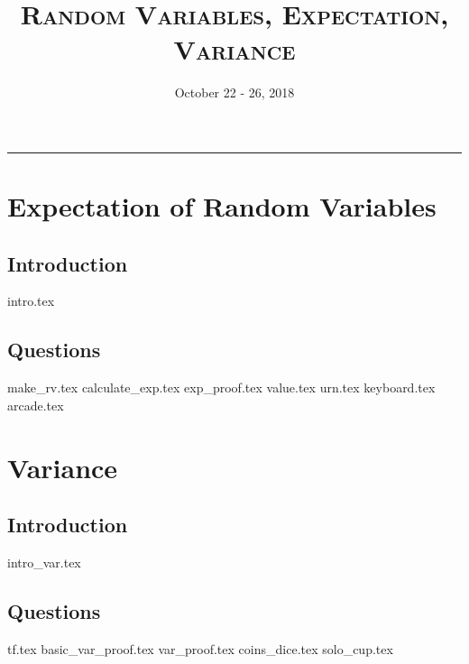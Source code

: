 \documentclass{exam}
\title{\textsc{Random Variables, Expectation, Variance}}
\date{October 22 - 26, 2018}
\begin{document}
\maketitle
\rule{\textwidth}{0.15em}
\fontsize{12}{15}\selectfont
\thispagestyle{empty}


\section{Expectation of Random Variables}
\subsection{Introduction}
{intro.tex}
\subsection{Questions}
\begin{questions}
{make_rv.tex}
{calculate_exp.tex}
{exp_proof.tex}
{value.tex}
{urn.tex}
{keyboard.tex}
{arcade.tex}
\end{questions}
\section{Variance}
\subsection{Introduction}
{intro_var.tex}
\subsection{Questions}
\begin{questions}
{tf.tex}
{basic_var_proof.tex}
{var_proof.tex}
{coins_dice.tex}
{solo_cup.tex}
\end{questions}
\end{document}
